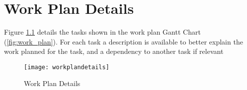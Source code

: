 \chapter{Work Plan Details}
\label{ann:workplan_details}

Figure \ref{fig:workplan_details} details the tasks shown in the work plan Gantt Chart (\ref{fig:work_plan}). For each task a description is available to better explain the work planned for the task, and a dependency to another task if relevant

\begin{figure}[htbp]
	\centerline{\texttt{[image: workplandetails]}}%
	\caption{Work Plan Details}
	\label{fig:workplan_details}
\end{figure}